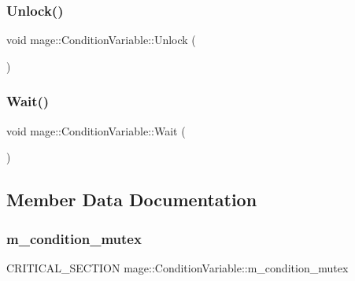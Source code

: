 \hypertarget{classmage_1_1_condition_variable_a3b3fe63417b7d7adedc9fe015fc7feea}{}\label{classmage_1_1_condition_variable_a3b3fe63417b7d7adedc9fe015fc7feea} 
\subsubsection{\texorpdfstring{Unlock()}{Unlock()}}
{\footnotesize\ttfamily void mage\+::\+Condition\+Variable\+::\+Unlock (\begin{DoxyParamCaption}{ }\end{DoxyParamCaption})}

\hypertarget{classmage_1_1_condition_variable_abc279c54285145d981f409c2d110c85a}{}\label{classmage_1_1_condition_variable_abc279c54285145d981f409c2d110c85a} 
\subsubsection{\texorpdfstring{Wait()}{Wait()}}
{\footnotesize\ttfamily void mage\+::\+Condition\+Variable\+::\+Wait (\begin{DoxyParamCaption}{ }\end{DoxyParamCaption})}



\subsection{Member Data Documentation}
\hypertarget{classmage_1_1_condition_variable_ab5ff870b2881a1979ccaec986d762441}{}\label{classmage_1_1_condition_variable_ab5ff870b2881a1979ccaec986d762441} 
\subsubsection{\texorpdfstring{m\+\_\+condition\+\_\+mutex}{m\_condition\_mutex}}
{\footnotesize\ttfamily C\+R\+I\+T\+I\+C\+A\+L\+\_\+\+S\+E\+C\+T\+I\+ON mage\+::\+Condition\+Variable\+::m\+\_\+condition\+\_\+mutex\hspace{0.3cm}{\ttfamily [private]}}

